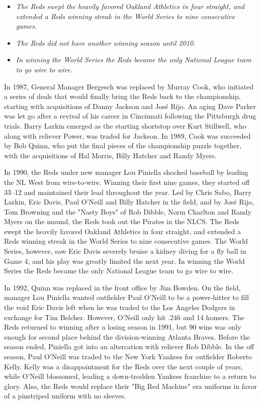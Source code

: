 \begin{itemize}
\item
  \emph{The Reds swept the heavily favored Oakland Athletics in four
  straight, and extended a Reds winning streak in the World Series to
  nine consecutive games.}
\item
  \emph{The Reds did not have another winning season until 2010.}
\item
  \emph{In winning the World Series the Reds became the only National
  League team to go wire to wire.}
\end{itemize}

In 1987, General Manager Bergesch was replaced by Murray Cook, who
initiated a series of deals that would finally bring the Reds back to
the championship, starting with acquisitions of Danny Jackson and José
Rijo. An aging Dave Parker was let go after a revival of his career in
Cincinnati following the Pittsburgh drug trials. Barry Larkin emerged as
the starting shortstop over Kurt Stillwell, who along with reliever
Power, was traded for Jackson. In 1989, Cook was succeeded by Bob Quinn,
who put the final pieces of the championship puzzle together, with the
acquisitions of Hal Morris, Billy Hatcher and Randy Myers.

In 1990, the Reds under new manager Lou Piniella shocked baseball by
leading the NL West from wire-to-wire. Winning their first nine games,
they started off 33--12 and maintained their lead throughout the year.
Led by Chris Sabo, Barry Larkin, Eric Davis, Paul O'Neill and Billy
Hatcher in the field, and by José Rijo, Tom Browning and the "Nasty
Boys" of Rob Dibble, Norm Charlton and Randy Myers on the mound, the
Reds took out the Pirates in the NLCS. The Reds swept the heavily
favored Oakland Athletics in four straight, and extended a Reds winning
streak in the World Series to nine consecutive games. The World Series,
however, saw Eric Davis severely bruise a kidney diving for a fly ball
in Game 4, and his play was greatly limited the next year. In winning
the World Series the Reds became the only National League team to go
wire to wire.

In 1992, Quinn was replaced in the front office by Jim Bowden. On the
field, manager Lou Piniella wanted outfielder Paul O'Neill to be a
power-hitter to fill the void Eric Davis left when he was traded to the
Los Angeles Dodgers in exchange for Tim Belcher. However, O'Neill only
hit .246 and 14 homers. The Reds returned to winning after a losing
season in 1991, but 90 wins was only enough for second place behind the
division-winning Atlanta Braves. Before the season ended, Piniella got
into an altercation with reliever Rob Dibble. In the off season, Paul
O'Neill was traded to the New York Yankees for outfielder Roberto Kelly.
Kelly was a disappointment for the Reds over the next couple of years,
while O'Neill blossomed, leading a down-trodden Yankees franchise to a
return to glory. Also, the Reds would replace their "Big Red Machine"
era uniforms in favor of a pinstriped uniform with no sleeves.

